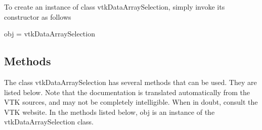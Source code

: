 To create an instance of class vtk\-Data\-Array\-Selection, simply invoke its constructor as follows \begin{DoxyVerb}  obj = vtkDataArraySelection
\end{DoxyVerb}
 \hypertarget{vtkwidgets_vtkxyplotwidget_Methods}{}\subsection{Methods}\label{vtkwidgets_vtkxyplotwidget_Methods}
The class vtk\-Data\-Array\-Selection has several methods that can be used. They are listed below. Note that the documentation is translated automatically from the V\-T\-K sources, and may not be completely intelligible. When in doubt, consult the V\-T\-K website. In the methods listed below, {\ttfamily obj} is an instance of the vtk\-Data\-Array\-Selection class. 
